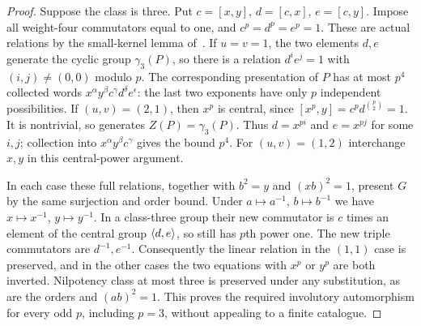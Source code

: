 \begin{proof}
Suppose the class is three. Put $c=[x,y]$, $d=[c,x]$,
$e=[c,y]$. Impose all weight-four commutators equal to one,
and $c^p=d^p=e^p=1$. These are actual relations by
the small-kernel lemma of~\cite{UF}. If $u=v=1$, the two elements $d,e$
generate the cyclic group $\gamma_3(P)$, so there is a relation
$d^i e^j=1$ with $(i,j)\ne(0,0)$ modulo $p$.
The corresponding presentation of $P$ has at most $p^4$ collected
words $x^\alpha y^\beta c^\gamma d^\delta e^\epsilon$:
the last two exponents have only $p$ independent possibilities.
If $(u,v)=(2,1)$, then $x^p$ is central, since
$[x^p,y]=c^p d^{\binom p2}=1$.
It is nontrivial, so generates $Z(P)=\gamma_3(P)$.
Thus $d=x^{pi}$ and $e=x^{pj}$ for some $i,j$; collection into
$x^\alpha y^\beta c^\gamma$ gives the bound $p^4$.
For $(u,v)=(1,2)$ interchange $x,y$ in this central-power argument.

In each case these full relations, together with $b^2=y$ and
$(xb)^2=1$, present $G$ by the same surjection and order bound.
Under $a\mapsto a^{-1}$, $b\mapsto b^{-1}$ we have
$x\mapsto x^{-1}$, $y\mapsto y^{-1}$.
In a class-three group their new commutator is $c$ times an element
of the central group $\langle d,e\rangle$, so still has $p$th power one.
The new triple commutators are $d^{-1},e^{-1}$.
Consequently the linear relation in the $(1,1)$ case is preserved,
and in the other cases the two equations with $x^p$ or $y^p$
are both inverted. Nilpotency class at most three is preserved under
any substitution, as are the orders and $(ab)^2=1$.
This proves the required involutory automorphism for every odd $p$,
including $p=3$, without appealing to a finite catalogue.
\end{proof}

